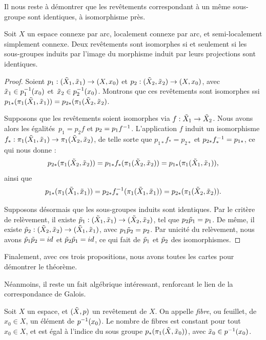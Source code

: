 Il nous reste à démontrer que les revêtements correspondant à un même sous-groupe sont identiques, à isomorphisme près.

\begin{proposition}
Soit $X$ un espace connexe par arc, localement connexe par arc, et semi-localement simplement connexe. Deux revêtements sont isomorphes si et seulement si les sous-groupes induits par l'image du morphisme induit par leurs projections sont identiques.
\end{proposition}

\begin{proof}
Soient $p_1:(\Tilde{X}_1,\Tilde{x}_1)\to (X,x_0)$ et $p_2:(\Tilde{X}_2,\Tilde{x}_2)\to (X,x_0)$, avec~$\Tilde{x}_1\in p_1^{-1}(x_0)$ et~${\Tilde{x}_2\in p_2^{-1}(x_0)}$. Montrons que ces revêtements sont isomorphes ssi ${p_{1\ast}(\pi_1(\Tilde{X}_1,\Tilde{x}_1))=p_{2\ast}(\pi_1(\Tilde{X}_2,\Tilde{x}_2)}$.

Supposons que les revêtements soient isomorphes via $f:\Tilde{X}_1\to \Tilde{X}_2$. Nous avons alors les égalités~${p_1=p_2f}$ et $p_2=p_1f^{-1}$. L'application $f$ induit un isomorphisme $f_\ast:\pi_1(\Tilde{X}_1,\Tilde{x}_1)\to \pi_1(\Tilde{X}_2,\Tilde{x}_2)$, de telle sorte que $p_{1\ast}f_\ast=p_{2\ast}$ et $p_{2\ast}f^{-1}_\ast=p_{1\ast}$, ce qui nous donne : \[p_{2\ast}(\pi_1(\Tilde{X}_2,\Tilde{x}_2))=p_{1\ast}f_\ast(\pi_1(\Tilde{X}_2,\Tilde{x}_2))=p_{1\ast}(\pi_1(\Tilde{X}_1,\Tilde{x}_1)),\] ainsi que \[p_{1\ast}(\pi_1(\Tilde{X}_1,\Tilde{x}_1))=p_{2\ast}f^{-1}_\ast(\pi_1(\Tilde{X}_1,\Tilde{x}_1))=p_{2\ast}(\pi_1(\Tilde{X}_2,\Tilde{x}_2)).\]

Supposons désormais que les sous-groupes induits sont identiques. Par le critère de relèvement, il existe $\Tilde{p}_1:(\Tilde{X}_1,\Tilde{x}_1)\to(\Tilde{X}_2,\Tilde{x}_2)$, tel que $p_2\Tilde{p}_1=p_1$. De même, il existe $\Tilde{p}_2:(\Tilde{X}_2,\Tilde{x}_2)\to(\Tilde{X}_1,\Tilde{x}_1)$, avec $p_1\Tilde{p}_2=p_2$. Par unicité du relèvement, nous avons $\Tilde{p}_1\Tilde{p}_2=id$ et $\Tilde{p}_2\Tilde{p}_1=id$, ce qui fait de $\Tilde{p}_1$ et $\Tilde{p}_2$ des isomorphismes.
\end{proof}

Finalement, avec ces trois propositions, nous avons toutes les cartes pour démontrer le théorème.

\bigskip Néanmoins, il reste un fait algébrique intéressant, renforcant le lien de la correspondance de Galois.

\begin{proposition}
Soit $X$ un espace, et $(\Tilde{X},p)$ un revêtement de $X$. On appelle \emph{fibre}, ou feuillet, de $x_0\in X$, un élément de $p^{-1}(x_0)$. Le nombre de fibres est constant pour tout $x_0\in X$, et est égal à l'indice du sous groupe $p_\ast(\pi_1(\Tilde{X},\Tilde{x}_0))$, avec $\Tilde{x}_0\in p^{-1}(x_0)$.
\end{proposition}

